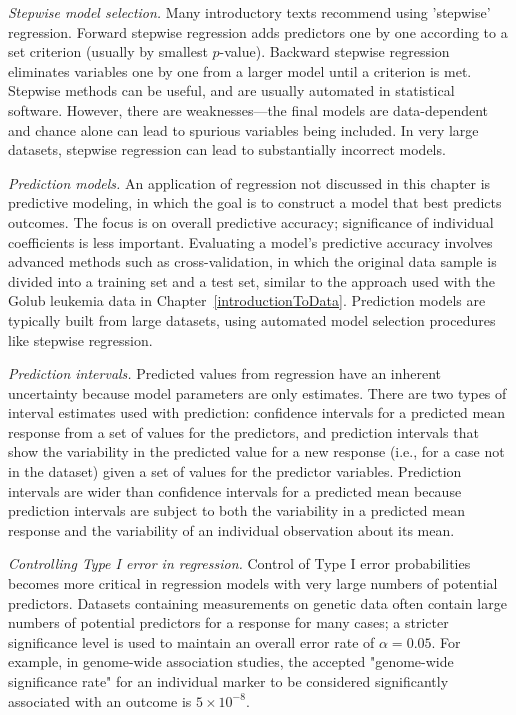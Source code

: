\begin{description}
	\item \emph{Stepwise model selection.} Many introductory texts recommend using 'stepwise' regression. Forward stepwise regression adds predictors one by one according to a set criterion (usually by smallest $p$-value). Backward stepwise regression eliminates variables one by one from a larger model until a criterion is met. Stepwise methods can be useful, and are usually automated in statistical software. However, there are weaknesses---the final models are data-dependent and chance alone can lead to spurious variables being included. In very large datasets, stepwise regression can lead to substantially incorrect models.
	
	\item \emph{Prediction models.} An application of regression not discussed in this chapter is predictive modeling, in which the goal is to construct a model that best predicts outcomes. The focus is on overall predictive accuracy; significance of individual coefficients is less important. Evaluating a model's predictive accuracy involves advanced methods such as cross-validation, in which the original data sample is divided into a training set and a test set, similar to the approach used with the Golub leukemia data in Chapter~\ref{introductionToData}. Prediction models are typically built from large datasets, using automated model selection procedures like stepwise regression.
	
	\item \emph{Prediction intervals.} Predicted values from regression have an inherent uncertainty because model parameters are only estimates. There are two types of interval estimates used with prediction: confidence intervals for a predicted mean response from a set of values for the predictors, and prediction intervals that show the variability in the predicted value for a new response (i.e., for a case not in the dataset) given a set of values for the predictor variables. Prediction intervals are wider than confidence intervals for a predicted mean because prediction intervals are subject to both the variability in a predicted mean response and the variability of an individual observation about its mean.
	
	\item \emph{Controlling Type I error in regression.} Control of Type I error probabilities becomes more critical in regression models with very large numbers of potential predictors. Datasets containing measurements on genetic data often contain large numbers of potential predictors for a response for many cases; a stricter significance level is used to maintain an overall error rate of $\alpha = 0.05$. For example, in genome-wide association studies, the accepted "genome-wide significance rate" for an individual marker to be considered significantly associated with an outcome is $5 \times 10^{-8}$.
	
\end{description}

